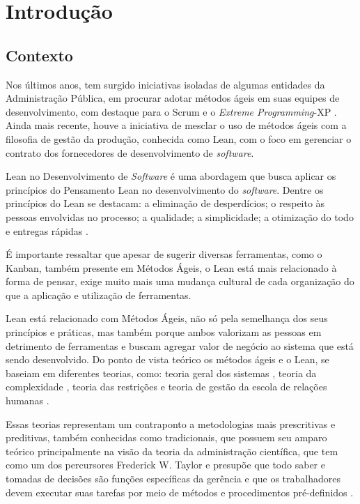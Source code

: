 
\chapter[Introdução]{Introdução}



\section[Contexto]{Contexto}

Nos últimos anos, tem surgido iniciativas isoladas de algumas entidades da Administração Pública, em procurar adotar métodos ágeis em suas equipes de desenvolvimento, com destaque para o Scrum e o \textit{Extreme Programming}-XP \cite{TCU:2013} \cite{RTMAC}.  Ainda mais recente, houve a iniciativa de mesclar o uso de métodos ágeis com a filosofia de gestão da produção, conhecida como Lean, com o foco em gerenciar o contrato dos fornecedores de desenvolvimento de \textit{software}. 

Lean no Desenvolvimento de \textit{Software} é uma abordagem que busca aplicar os princípios do Pensamento Lean no desenvolvimento do \textit{software}. Dentre os princípios do Lean se destacam: a eliminação de desperdícios; o respeito às pessoas envolvidas no processo; a qualidade; a simplicidade; a otimização do todo e entregas rápidas \cite{poppendieck}.

É importante ressaltar que apesar de sugerir diversas ferramentas, como o Kanban, também presente em Métodos Ágeis, o Lean está mais relacionado à forma de pensar, exige muito mais uma mudança cultural de cada organização do que a aplicação e utilização de ferramentas. 

Lean está relacionado com Métodos Ágeis, não só pela semelhança dos seus princípios e práticas, mas também porque ambos valorizam as pessoas em detrimento de ferramentas e buscam agregar valor de negócio ao sistema que está sendo desenvolvido. Do ponto de vista teórico os métodos ágeis e o Lean, se baseiam em diferentes teorias, como: teoria geral dos sistemas \cite{sistemas}, teoria da complexidade \cite{complexidade}, teoria das restrições \cite{katayama2010} e teoria de gestão da escola de relações humanas \cite{administracao}. 

Essas teorias representam um contraponto a metodologias mais prescritivas e preditivas, também conhecidas como tradicionais, que possuem seu amparo teórico principalmente na visão da teoria da administração científica, que tem como um dos percursores Frederick W. Taylor e presupõe que todo saber e tomadas de decisões são funções específicas da gerência e que os trabalhadores devem executar suas tarefas por meio de métodos e procedimentos pré-definidos \cite{administracao}.

